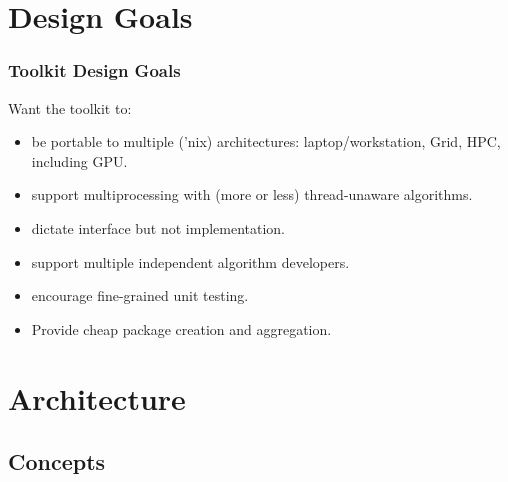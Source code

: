 \documentclass[xcolor=dvipsnames]{beamer}
\begin{document}
\section{Design Goals}

\begin{frame}
\end{frame}

\begin{frame}
  \frametitle{Toolkit Design Goals}

  Want the toolkit to:
  \begin{itemize}
  \item be portable to multiple ('nix) architectures: laptop/workstation, Grid, HPC, including GPU.
  \item support multiprocessing with (more or less) thread-unaware algorithms.
  \item dictate interface but not implementation.
  \item support multiple independent algorithm developers.
  \item encourage fine-grained unit testing.
  \item Provide cheap package creation and aggregation.
  \end{itemize}

\end{frame}


\section{Architecture}

\begin{frame}
\end{frame}

\subsection{Concepts}
\end{document}
